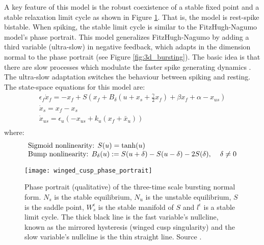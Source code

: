 \documentclass[a4paper, 12pt]{article}
\begin{document}
A key feature of this model is the robust coexistence of a stable fixed point and a stable relaxation limit cycle as shown in Figure \ref{fig:bursting_fundamental_phase_portait}. That is, the model is rest-spike bistable. When spiking, the stable limit cycle is similar to the FitzHugh-Nagumo model's phase portrait. This model generalizes FitzHugh-Nagumo by adding a third variable (ultra-slow) in negative feedback, which adapts in the dimension normal to the phase portrait (see Figure \ref{fig:3d_bursting}). The basic idea is that there are slow processes which modulate the faster spike generating dynamics \cite{rinzel}. The ultra-slow adaptation switches the behaviour between spiking and resting. The state-space equations for this model are:
\begin{equation}
\begin{array}{l}
\displaystyle \epsilon_f\dot{x}_{f} = -x_f + S\left(x_f + B_\delta\left(u + x_s + \tfrac{\gamma}{2}x_f\right) + \beta x_f + \alpha  - x_{us}  \right)\\
\displaystyle \dot{x}_{s} = x_f - x_s \\
\displaystyle \dot{x}_{us} = \epsilon_u\left(-x_{us} + k_u(x_f+\bar{x}_u) \right)\\
\end{array}
\label{eq:restSpikeBistability}
\end{equation}
where:
\begin{equation}
\begin{array}{l}
\displaystyle \text{Sigmoid nonlinearity: }S(u) = \text{tanh}(u) \\
\displaystyle \text{Bump nonlinearity: }B_\delta(u) := S(u+\delta) - S(u-\delta) -2S(\delta),\hspace{0.4cm} \delta\neq0
\end{array}
\end{equation}


\begin{figure}[h!]
\texttt{[image: winged\_cusp\_phase\_portrait]}
\caption{Phase portrait (qualitative) of the three-time scale bursting normal form. $N_s$ is the stable equilibrium, $N_u$ is the unstable equilibrium, $S$ is the saddle point, $W_s^\epsilon$ is the stable manifold of $S$ and $l^\epsilon$ is a stable limit cycle. The thick black line is the fast variable's nullcline, known as the mirrored hysteresis (winged cusp singularity) and the slow variable's nullcline is the thin straight line. Source \cite{franci2}.}
\label{fig:bursting_fundamental_phase_portait}
\end{figure}
\end{document}

